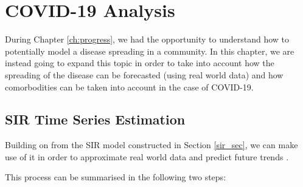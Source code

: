 \chapter{COVID-19 Analysis}
\setcounter{secnumdepth}{5}
\label{ch:AI}
\setlength\lineskip{0pt}
\vspace*{15pt}

 
 
\lstset{style=mystyle}

During Chapter \ref{ch:progress}, we had the opportunity to understand how to potentially model a disease spreading in a community. In this chapter, we are instead going to expand this topic in order to take into account how the spreading of the disease can be forecasted (using real world data) and how comorbodities can be taken into account in the case of COVID-19.

\section{SIR Time Series Estimation}
\label{tool_ref_app}
Building on from the SIR model constructed in Section \ref{sir_sec}, we can make use of it in order to approximate real world data and predict future trends \cite{atom}.

This process can be summarised in the following two steps:

